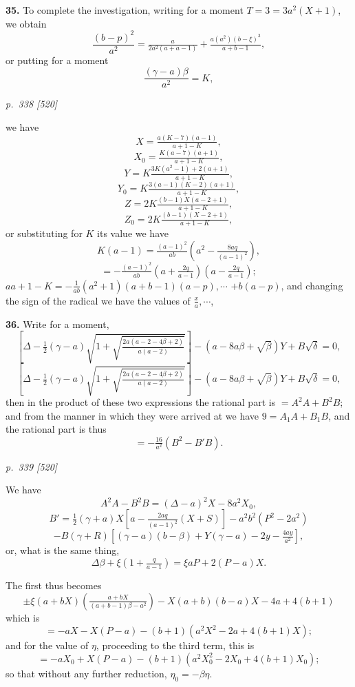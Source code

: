 \documentclass[11pt,a4paper]{article}
\theoremstyle{plain}
\theoremstyle{definition}
\begin{document}
\textbf{35.} To complete the investigation, writing for a moment $T = 3 = 3a^2(X + 1)$, we obtain
\[
\frac{(b - p)^2}{a^2} = \tfrac{a}{2a^2(a + a - 1)} + \tfrac{a(a^2)(b - \xi)^3}{a + b - 1},
\]
or putting for a moment
\[
\frac{(\gamma - a)\beta}{a^2} = K,
\]

\clearpage

\bigskip
\textit{p.~338 [520]}
\smallskip

we have
\[
X = \tfrac{a(K - 7)(a - 1)}{a + 1 - K},
\]
\[
X_0 = \tfrac{K(a - 7)(a + 1)}{a + 1 - K},
\]
\[
Y = K \tfrac{3K(a^2 - 1) + 2(a + 1)}{a + 1 - K},
\]
\[
Y_0 = K \tfrac{3(a - 1)(K - 2)(a + 1)}{a + 1 - K},
\]
\[
Z = 2K \tfrac{(b - 1)X(a - 2 + 1)}{a + 1 - K},
\]
\[
Z_0 = 2K \tfrac{(b - 1)(X - 2 + 1)}{a + 1 - K},
\]
or substituting for $K$ its value we have
\[
K(a - 1) = \tfrac{(a - 1)^2}{ab}\!\left(a^2 - \tfrac{8aq}{(a - 1)^2}\right),
\]
\[
= -\tfrac{(a - 1)^2}{ab}\!\left(a + \tfrac{2q}{a - 1}\right)\!\left(a - \tfrac{2q}{a - 1}\right);
\]
$a a + 1 - K = -\tfrac{1}{ab}(a^2 + 1)\!\left(a + b - 1\right)(a - p), \cdots$
$+ b\!(a - p)$,
and changing the sign of the radical we have the values of $\tfrac{x}{a}, \cdots$,

\textbf{36.} Write for a moment,
\[
\left[\Delta - \tfrac{1}{2}(\gamma - a)\sqrt{1 + \sqrt{\tfrac{2a(a - 2 - 4\beta + 2)}{a(a - 2)}}}\right] - (a - 8a\beta + \sqrt{\beta})Y + B\sqrt{\delta} = 0,
\]
\[
\left[\Delta - \tfrac{1}{2}(\gamma - a)\sqrt{1 + \sqrt{\tfrac{2a(a - 2 - 4\beta + 2)}{a(a - 2)}}}\right] - (a - 8a\beta + \sqrt{\beta})Y + B\sqrt{\delta} = 0,
\]
then in the product of these two expressions the rational part is $= A^2A + B^2B$; and from the manner in which they were arrived at we have $9 = A_1A + B_1B$, and the rational part is thus
\[
= -\tfrac{16}{a^2}(B^2 - B'B).
\]

\clearpage

\bigskip
\textit{p.~339 [520]}
\smallskip


We have
\[
A^2A - B^2B = (\Delta - a)^2 X - 8a^2 X_0,
\]
\[
B' = \tfrac{1}{2}(\gamma + a)X\!\left[a - \tfrac{2aq}{(a - 1)^2}(X + S)\right] - a^2 b^2(P^2 - 2a^2)
\]
\[
- B(\gamma + R)\!\left[(\gamma - a)(b - \beta) + Y(\gamma - a) - 2y - \tfrac{4ay}{a^2}\right],
\]
or, what is the same thing,
\[
\Delta\beta + \xi\!\left(1 + \tfrac{q}{a - 1}\right) = \xi a P + 2(P - a)X.
\]

The first thus becomes
\[
\pm \xi(a + bX)\!\left(\tfrac{a + b X}{(a + b - 1)\beta - a^2}\right) - X(a + b)(b - a)X - 4a + 4(b + 1)
\]
which is
\[
= -aX - X(P - a) - (b + 1)(a^2X^2 - 2a + 4(b + 1)X);
\]
and for the value of $\eta$, proceeding to the third term, this is
\[
= -aX_0 + X(P - a) - (b + 1)(a^2 X_0^2 - 2X_0 + 4(b + 1)X_0);
\]
so that without any further reduction, $\eta_0 = -\beta\eta$.
\end{document}
